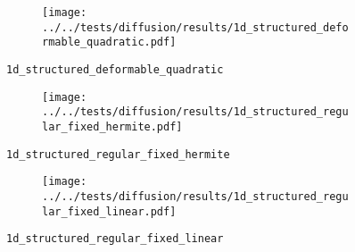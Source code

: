%
%
\begin{frame}{}
  \vspace*{-0.2cm}
  \begin{figure}[h!]
    \begin{subfigure}[t]{0.5\textwidth}%
    \centering
    \end{subfigure}
    \begin{subfigure}[t]{0.48\textwidth}%
      \centering%
      \texttt{[image: ../../tests/diffusion/results/1d\_structured\_deformable\_quadratic.pdf]}%
    \end{subfigure}%
    \caption{\lstinline{1d_structured_deformable_quadratic}}
  \end{figure} 
\end{frame}
%
%
\begin{frame}{}
  \vspace*{-0.2cm}
  \begin{figure}[h!]
    \begin{subfigure}[t]{0.5\textwidth}%
    \centering
    \end{subfigure}
    \begin{subfigure}[t]{0.48\textwidth}%
      \centering%
      \texttt{[image: ../../tests/diffusion/results/1d\_structured\_regular\_fixed\_hermite.pdf]}%
    \end{subfigure}%
    \caption{\lstinline{1d_structured_regular_fixed_hermite}}
  \end{figure} 
\end{frame}
%
%
\begin{frame}{}
  \vspace*{-0.2cm}
  \begin{figure}[h!]
    \begin{subfigure}[t]{0.5\textwidth}%
    \centering
    \end{subfigure}
    \begin{subfigure}[t]{0.48\textwidth}%
      \centering%
      \texttt{[image: ../../tests/diffusion/results/1d\_structured\_regular\_fixed\_linear.pdf]}%
    \end{subfigure}%
    \caption{\lstinline{1d_structured_regular_fixed_linear}}
  \end{figure} 
\end{frame}
